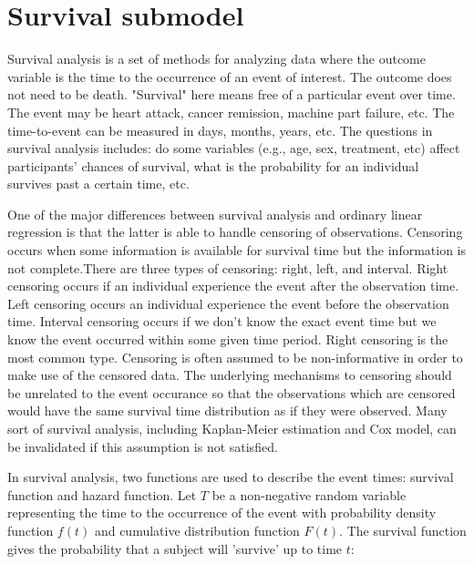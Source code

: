 \documentclass{article}
\numberwithin{equation}{section}
\begin{document}
\section{Survival submodel}
Survival analysis is a set of methods for analyzing data where the outcome variable is the time to the occurrence of an event of interest. The outcome does not need to be death. "Survival" here means free of a particular event over time. The event may be heart attack, cancer remission, machine part failure, etc. The time-to-event can be measured in days, months, years, etc. The questions in survival analysis includes: do some variables (e.g., age, sex, treatment, etc) affect participants' chances of survival, what is the probability for an individual survives past a certain time, etc.

One of the major differences between survival analysis and ordinary linear regression is that the latter is able to handle censoring of observations. Censoring occurs when some information is available for survival time but the information is not complete.There are three types of censoring: right, left, and interval. Right censoring occurs if an individual experience the event after the observation time. Left censoring occurs an individual experience the event before the observation time. Interval censoring occurs if we don't know the exact event time but we know the event occurred within some given time period. Right censoring is the most common type. Censoring is often assumed to be non-informative in order to make use of the censored data. The underlying mechanisms to censoring should be unrelated to the event occurance so that the observations which are censored would have the same survival time distribution as if they were observed. Many sort of survival analysis, including Kaplan-Meier estimation and Cox model, can be invalidated if this assumption is not satisfied. 

In survival analysis, two functions are used to describe the event times: survival function and hazard function. Let $T$ be a non-negative random variable representing the time to the occurrence of the event with probability density function $f(t)$ and cumulative distribution function $F(t)$. The survival function gives the probability that a subject will 'survive' up to time $t$:
\end{document}
